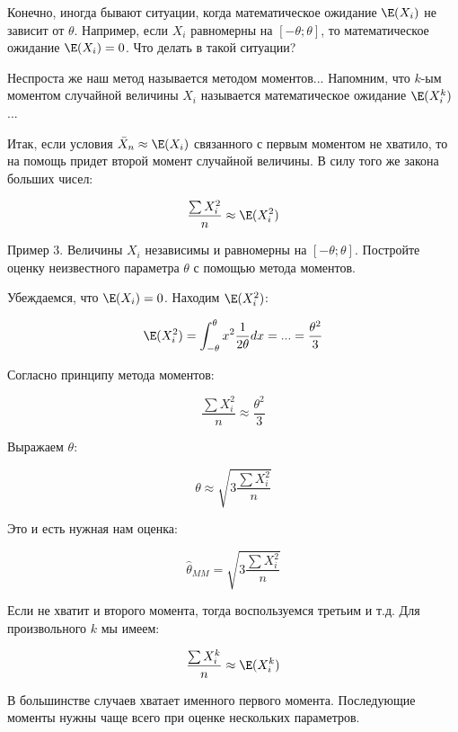 Конечно, иногда бывают ситуации, когда математическое ожидание $ \E(X_{i}) $ не зависит от $ \theta $. Например, если $ X_{i} $ равномерны на $ [-\theta;\theta] $, то математическое ожидание $ \E(X_{i})=0 $. Что делать в такой ситуации? 

Неспроста же наш метод называется методом моментов... Напомним, что $ k $-ым моментом случайной величины $ X_{i} $ называется математическое ожидание $ \E(X_{i}^{k}) $...


Итак, если условия $\bar{X}_{n}\approx \E(X_{i})$ связанного с первым моментом не хватило, то на помощь придет второй момент случайной величины. В силу того же закона больших чисел:

\[ \frac{\sum X_{i}^{2}}{n} \approx \E(X_{i}^{2})\]


Пример 3. Величины $ X_{i} $ независимы и равномерны на $ [-\theta;\theta] $. Постройте оценку неизвестного параметра $ \theta $ с помощью метода моментов.

Убеждаемся, что $\E(X_{i})=0$. Находим $ \E(X_{i}^{2}) $:

\[  \E(X_{i}^{2}) = \int _{-\theta}^{\theta} x^{2} \frac{1}{2\theta}dx=...=\frac{\theta^{2}}{3} \]

Согласно принципу метода моментов:

\[ \frac{\sum X_{i}^{2}}{n} \approx \frac{\theta^{2}}{3} \]

Выражаем $ \theta $:

\[ \theta\approx \sqrt{3\frac{\sum X_{i}^{2}}{n} }\]

Это и есть нужная нам оценка:

\[ \hat{\theta}_{MM}= \sqrt{3\frac{\sum X_{i}^{2}}{n} }\]

Если не хватит и второго момента, тогда воспользуемся третьим и т.д. Для произвольного $k$ мы имеем:

\[ \frac{\sum X_{i}^{k}}{n} \approx \E(X_{i}^{k})\]

В большинстве случаев хватает именного первого момента. Последующие моменты нужны чаще всего при оценке нескольких параметров.







